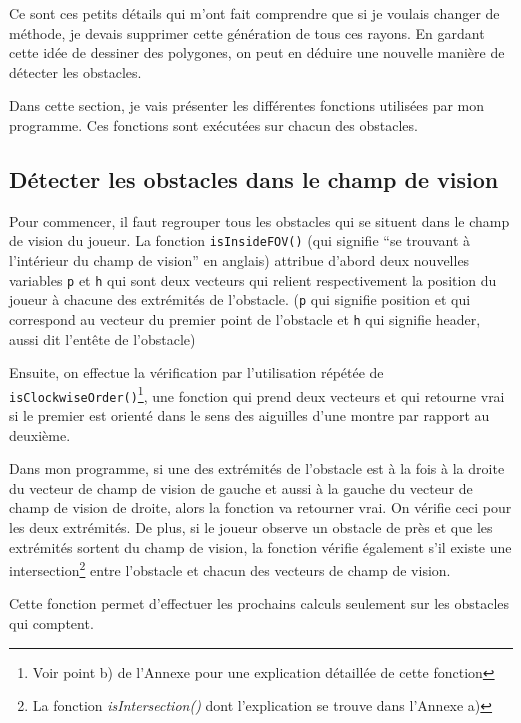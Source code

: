 \documentclass[11pt,french,a4paper,]{article}
\begin{document}
Ce sont ces petits détails qui m'ont fait comprendre que si je voulais
changer de méthode, je devais supprimer cette génération de tous ces
rayons. En gardant cette idée de dessiner des polygones, on peut en
déduire une nouvelle manière de détecter les obstacles.

Dans cette section, je vais présenter les différentes fonctions
utilisées par mon programme. Ces fonctions sont exécutées sur chacun des
obstacles.

\hypertarget{duxe9tecter-les-obstacles-dans-le-champ-de-vision}{%
\subsection{Détecter les obstacles dans le champ de
vision}\label{duxe9tecter-les-obstacles-dans-le-champ-de-vision}}

Pour commencer, il faut regrouper tous les obstacles qui se situent dans
le champ de vision du joueur. La fonction \texttt{isInsideFOV()} (qui
signifie ``se trouvant à l'intérieur du champ de vision'' en anglais)
attribue d'abord deux nouvelles variables \texttt{p} et \texttt{h} qui
sont deux vecteurs qui relient respectivement la position du joueur à
chacune des extrémités de l'obstacle. (\texttt{p} qui signifie position
et qui correspond au vecteur du premier point de l'obstacle et
\texttt{h} qui signifie header, aussi dit l'entête de l'obstacle)

Ensuite, on effectue la vérification par l'utilisation répétée de
\texttt{isClockwiseOrder()}\footnote{Voir point b) de l'Annexe pour une
  explication détaillée de cette fonction}, une fonction qui prend deux
vecteurs et qui retourne vrai si le premier est orienté dans le sens des
aiguilles d'une montre par rapport au deuxième.

Dans mon programme, si une des extrémités de l'obstacle est à la fois à
la droite du vecteur de champ de vision de gauche et aussi à la gauche
du vecteur de champ de vision de droite, alors la fonction va retourner
vrai. On vérifie ceci pour les deux extrémités. De plus, si le joueur
observe un obstacle de près et que les extrémités sortent du champ de
vision, la fonction vérifie également s'il existe une
intersection\footnote{La fonction \emph{isIntersection()} dont
  l'explication se trouve dans l'Annexe a)} entre l'obstacle et chacun
des vecteurs de champ de vision.

Cette fonction permet d'effectuer les prochains calculs seulement sur
les obstacles qui comptent.
\end{document}
